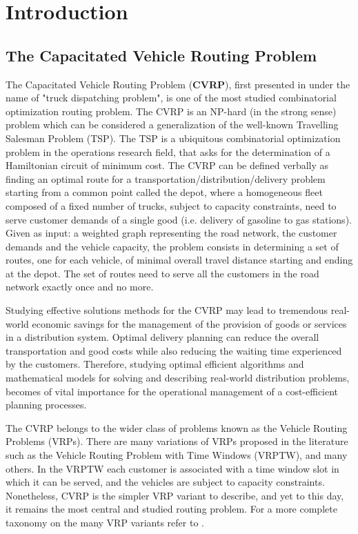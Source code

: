 \chapter{Introduction}
\label{sec:introduction-chapter}

\section{The Capacitated Vehicle Routing Problem}
\label{sec:intro-cvrp-problem}

The Capacitated Vehicle Routing Problem (\textbf{CVRP}), first presented in \textcite{dantzig1959}
under the name of "truck dispatching problem",
is one of the most studied combinatorial optimization routing problem.
The CVRP is an NP-hard (in the strong sense) problem which can be considered a generalization
of the well-known Travelling Salesman Problem (TSP).
The TSP is a ubiquitous combinatorial optimization problem
in the operations research field,
that asks for the determination of a Hamiltonian circuit of minimum cost.
The CVRP can be defined verbally as finding an optimal route for a transportation/distribution/delivery problem
starting from a common point called the depot,
where a homogeneous fleet composed of a fixed number of trucks, subject to capacity constraints,
need to serve customer demands of a single good (i.e. delivery of gasoline to gas stations).
Given as input: a weighted graph representing the road network,
the customer demands and the vehicle capacity,
the problem consists in determining a set of routes, one for each vehicle,
of minimal overall travel distance starting and ending at the depot.
The set of routes need to serve all the customers in the road network exactly once and no more.

Studying effective solutions methods for the CVRP may lead to tremendous real-world economic
savings for the management of the provision of goods or services in a distribution system.
Optimal delivery planning can reduce the overall transportation and good costs while
also reducing the waiting time experienced by the customers.
Therefore, studying optimal efficient algorithms and mathematical models for
solving and describing real-world distribution problems,
becomes of vital importance
for the operational management of a cost-efficient planning processes.

The CVRP belongs to the wider class of problems known as the Vehicle Routing Problems (VRPs).
There are many variations of VRPs proposed in the literature such as
the Vehicle Routing Problem with Time Windows (VRPTW), and many others.
In the VRPTW \parencite{schrage1981} each customer is associated with a time window slot
in which it can be served,
and the vehicles are subject to capacity constraints.
Nonetheless, CVRP is the simpler VRP variant to describe,
and yet to this day, it remains the most central and studied routing problem.
For a more complete taxonomy on the many VRP variants refer to \textcite{braekers2016}.

